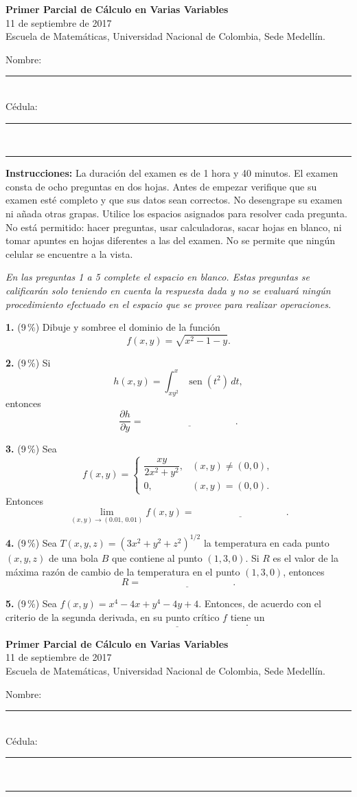 \documentclass[11pt]{article}
\newcommand{\examheader}{%
  \noindent
  \begin{minipage}[t]{0.62\linewidth}
    {\bfseries\large Primer Parcial de C\'alculo en Varias Variables}\\
    {\small 11 de septiembre de 2017}\\
    {\small Escuela de Matem\'aticas, Universidad Nacional de Colombia, Sede Medell\'in.}
  \end{minipage}%
  \hfill
  \begin{minipage}[t]{0.33\linewidth}
    \raggedleft\small
    Nombre: \rule{2.8cm}{0.4pt}\\[4pt]
    C\'edula: \rule{2.8cm}{0.4pt}
  \end{minipage}\\[4pt]
  \rule{\linewidth}{0.6pt}
}
\begin{document}
\examheader

\textbf{Instrucciones:} La duraci\'on del examen es de 1 hora y 40 minutos. El examen consta de ocho preguntas en dos hojas. Antes de empezar verifique que su examen est\'e completo y que sus datos sean correctos. No desengrape su examen ni a\~nada otras grapas. Utilice los espacios asignados para resolver cada pregunta. No est\'a permitido: hacer preguntas, usar calculadoras, sacar hojas en blanco, ni tomar apuntes en hojas diferentes a las del examen. No se permite que ning\'un celular se encuentre a la vista.

\bigskip

\textit{En las preguntas 1 a 5 complete el espacio en blanco. Estas preguntas se calificar\'an solo teniendo en cuenta la respuesta dada y no se evaluar\'a ning\'un procedimiento efectuado en el espacio que se provee para realizar operaciones.}

\bigskip
\noindent\textbf{1.} (9\,\%) Dibuje y sombree el dominio de la funci\'on
$$f(x,y) = \sqrt{x^2-1-y}.$$

\vspace{3.3cm}

\noindent\textbf{2.} (9\,\%) Si
$$h(x,y) = \int_{xy^2}^{x} \operatorname{sen}(t^2)\,dt,$$
entonces
$$\frac{\partial h}{\partial y} = \underline{\hspace{4cm}}.$$

\bigskip
\noindent\textbf{3.} (9\,\%) Sea
$$
f(x,y)=
\begin{cases}
\dfrac{xy}{2x^2+y^2}, & (x,y)\neq (0,0),\\[6pt]
0, & (x,y)=(0,0).
\end{cases}
$$
Entonces
$$\lim_{(x,y)\to(0.01,\,0.01)} f(x,y) = \underline{\hspace{4cm}}.$$

\bigskip
\noindent\textbf{4.} (9\,\%) Sea $T(x,y,z)=(3x^2+y^2+z^2)^{1/2}$ la temperatura en cada punto $(x,y,z)$ de una bola $B$ que contiene al punto $(1,3,0)$. Si $R$ es el valor de la m\'axima raz\'on de cambio de la temperatura en el punto $(1,3,0)$, entonces
$$R = \underline{\hspace{4cm}}.$$

\bigskip
\noindent\textbf{5.} (9\,\%) Sea $f(x,y)=x^4-4x+y^4-4y+4$. Entonces, de acuerdo con el criterio de la segunda derivada, en su punto cr\'itico $f$ tiene un
$$\underline{\hspace{6cm}}.$$

\newpage
\examheader
\vspace{2pt}
\end{document}
